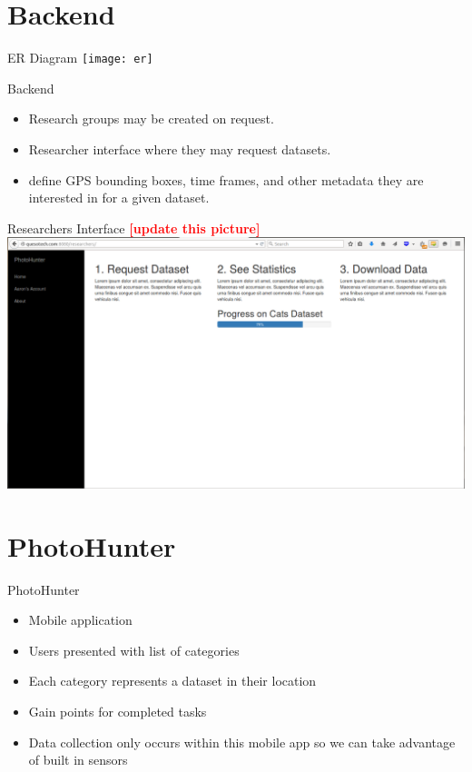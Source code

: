 \documentclass[aspectratio=169]{beamer}
\newcommand{\todo}[1]{\textcolor{red}{\textbf{[#1]}}}
\begin{document}
\section{Backend}

\begin{frame}{ER Diagram}
  \centering
  \texttt{[image: er]}
\end{frame}

\begin{frame}{Backend}
  \begin{itemize}
    \item Research groups may be created on request.

    \item Researcher interface where they may request datasets.

    \item define GPS bounding boxes, time frames, and other metadata they are
      interested in for a given dataset.
  \end{itemize}
\end{frame}

\begin{frame}{Researchers Interface}
  \centering
	\todo{update this picture}
  \includegraphics[width=\textwidth,height=\textheight,keepaspectratio]{researchers}
\end{frame}

\section{PhotoHunter}

\begin{frame}{PhotoHunter}
  \begin{itemize}

    \item Mobile application

    \item Users presented with list of categories

    \item Each category represents a dataset in their location

    \item Gain points for completed tasks

    \item Data collection only occurs within this mobile app so
          we can take advantage of built in sensors

  \end{itemize}
\end{frame}
\end{document}
